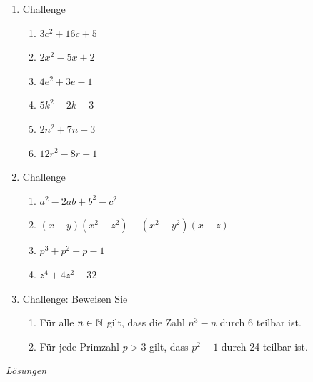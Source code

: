 \begin{ueb}
\begin{enumerate}[resume]
        \item Challenge
              \begin{enumerate}
                  \item \(3c^2+16c+5\)
                  \item \(2x^2-5x+2\)
                  \item \(4e^2+3e-1\)
                  \item \(5k^2-2k-3\)
                  \item \(2n^2+7n+3\)
                  \item \(12r^2-8r+1\)
              \end{enumerate}
        \item Challenge
              \begin{enumerate}
                  \item \(a^2-2ab+b^2-c^2\)
                  \item \((x-y)(x^2-z^2)-(x^2-y^2)(x-z)\)
                  \item \(p^3+p^2-p-1\)
                  \item \(z^4+4z^2-32\)
              \end{enumerate}
        \item Challenge: Beweisen Sie
              \begin{enumerate}
                  \item  Für alle \(n\in\mathbb{N}\) gilt, dass die Zahl \(n^3-n\) durch 6 teilbar ist.
                  \item  Für jede Primzahl \(p>3\) gilt, dass \(p^2-1\) durch 24 teilbar ist.
              \end{enumerate}

    \end{enumerate}
\end{ueb}
\clearpage
\emph{Lösungen}

